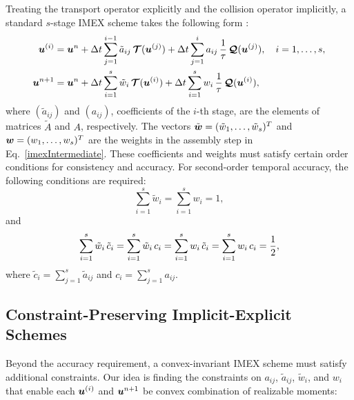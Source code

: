 Treating the transport operator explicitly and the collision operator implicitly, a standard $s$-stage IMEX scheme takes the following form \cite{pareschiRusso_2005}: 
\begin{align}
  \boldsymbol{u}^{(i)}
  &=\boldsymbol{u}^{n}
  +\Delta t\sum_{j=1}^{i-1}\tilde{a}_{ij}\,\boldsymbol{\mathcal{T}}(\boldsymbol{u}^{(j)})
  +\Delta t\sum_{j=1}^{i}a_{ij}\,\frac{1}{\tau}\,\boldsymbol{\mathcal{Q}}(\boldsymbol{u}^{(j)}),
  \quad i=1,\ldots,s, \label{imexStages} \\
  \boldsymbol{u}^{n+1}
  &=\boldsymbol{u}^{n}
  +\Delta t\sum_{i=1}^{s}\tilde{w}_{i}\,\boldsymbol{\mathcal{T}}(\boldsymbol{u}^{(i)})
  +\Delta t\sum_{i=1}^{s}w_{i}\,\frac{1}{\tau}\,\boldsymbol{\mathcal{Q}}(\boldsymbol{u}^{(i)}), \label{imexIntermediate} 
\end{align}
where $(\tilde{a}_{ij})$ and $(a_{ij})$, coefficients of the $i$-th stage, are the elements of matrices $\tilde{A}$ and $A$, respectively.
The vectors $\tilde{\boldsymbol{w}}=(\tilde{w}_{1},\ldots,\tilde{w}_{s})^{T}$ and $\boldsymbol{w}=(w_{1},\ldots,w_{s})^{T}$ are the weights in the assembly step in Eq.~\eqref{imexIntermediate}.
These coefficients and weights must satisfy certain order conditions for consistency and accuracy.  
For second-order temporal accuracy, the following conditions are required:
\begin{equation}
  \sum_{i=1}^{s}\tilde{w}_{i}=\sum_{i=1}^{s}w_{i}=1,
  \label{orderConditions1}
\end{equation}
and
\begin{equation}
  \sum_{i=1}^{s}\tilde{w}_{i}\,\tilde{c}_{i}
  =\sum_{i=1}^{s}\tilde{w}_{i}\,c_{i}
  =\sum_{i=1}^{s}w_{i}\,\tilde{c}_{i}
  =\sum_{i=1}^{s}w_{i}\,c_{i}=\frac{1}{2}, 
  \label{orderConditions2}
\end{equation}
where $\tilde{c}_{i} = \sum_{j=1}^{s}\tilde{a}_{ij}$ and $c_{i}=\sum_{j=1}^{s}a_{ij}$.


\subsection{Constraint-Preserving Implicit-Explicit Schemes}

Beyond the accuracy requirement, a convex-invariant IMEX scheme must satisfy additional constraints.
Our idea is finding the constraints on $a_{ij}$, $\tilde{a}_{ij}$, $\tilde{w}_{i}$, and $w_{i}$ that enable each $\boldsymbol{u}^{(i)}$ and $\boldsymbol{u}^{n+1}$ be convex combination of realizable moments:

